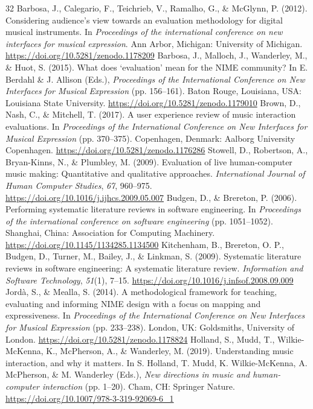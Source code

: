 \documentclass[sigconf]{nimeart}
\begin{document}
\begin{thebibliography}{32}
 {{ }}  Barbosa, J., Calegario, F., Teichrieb, V., Ramalho, G., \& McGlynn, P. (2012). Considering audience's view towards an evaluation methodology for digital musical instruments. In \emph{Proceedings of the international conference on new interfaces for musical expression}. Ann Arbor, Michigan: University of Michigan. \url{https://doi.org/10.5281/zenodo.1178209}{}
 {{ }}  Barbosa, J., Malloch, J., Wanderley, M., \& Huot, S. (2015). What does `evaluation' mean for the NIME community? In E. Berdahl \& J. Allison (Eds.), \emph{Proceedings of the International Conference on New Interfaces for Musical Expression} (pp. 156--161). Baton Rouge, Louisiana, USA: Louisiana State University. \url{https://doi.org/10.5281/zenodo.1179010}{}
 {{ }}  Brown, D., Nash, C., \& Mitchell, T. (2017). A user experience review of music interaction evaluations. In \emph{Proceedings of the International Conference on New Interfaces for Musical Expression} (pp. 370--375). Copenhagen, Denmark: Aalborg University Copenhagen. \url{https://doi.org/10.5281/zenodo.1176286}{}
 {{ }}  Stowell, D., Robertson, A., Bryan-Kinns, N., \& Plumbley, M. (2009). Evaluation of live human-computer music making: Quantitative and qualitative approaches. \emph{International Journal of Human Computer Studies}, \emph{67}, 960--975. \url{https://doi.org/10.1016/j.ijhcs.2009.05.007}{}
 {{ }}  Budgen, D., \& Brereton, P. (2006). Performing systematic literature reviews in software engineering. In \emph{Proceedings of the international conference on software engineering} (pp. 1051--1052). Shanghai, China: Association for Computing Machinery. \url{https://doi.org/10.1145/1134285.1134500}{}
 {{ }}  Kitchenham, B., Brereton, O. P., Budgen, D., Turner, M., Bailey, J., \& Linkman, S. (2009). Systematic literature reviews in software engineering: A systematic literature review. \emph{Information and Software Technology}, \emph{51}(1), 7--15. \url{https://doi.org/10.1016/j.infsof.2008.09.009}{}
 {{ }}  Jordà, S., \& Mealla, S. (2014). A methodological framework for teaching, evaluating and informing NIME design with a focus on mapping and expressiveness. In \emph{Proceedings of the International Conference on New Interfaces for Musical Expression} (pp. 233--238). London, UK: Goldsmiths, University of London. \url{https://doi.org/10.5281/zenodo.1178824}{}
 {{ }}  Holland, S., Mudd, T., Wilkie-McKenna, K., McPherson, A., \& Wanderley, M. (2019). Understanding music interaction, and why it matters. In S. Holland, T. Mudd, K. Wilkie-McKenna, A. McPherson, \& M. Wanderley (Eds.), \emph{New directions in music and human-computer interaction} (pp. 1--20). Cham, CH: Springer Nature. \url{https://doi.org/10.1007/978-3-319-92069-6_1}{}

\end{thebibliography}
\end{document}
